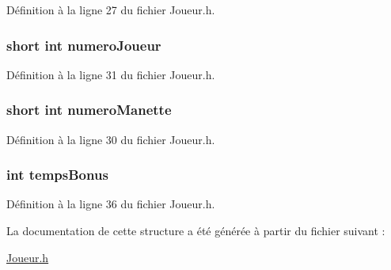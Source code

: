Définition à la ligne 27 du fichier Joueur.\-h.

\hypertarget{struct_joueur_a63ba7cc1f1d9cf8e7a5b77d508d833c4}{
\subsubsection[{numero\-Joueur}]{\setlength{\rightskip}{0pt plus 5cm}short int numero\-Joueur}}\label{struct_joueur_a63ba7cc1f1d9cf8e7a5b77d508d833c4}


Définition à la ligne 31 du fichier Joueur.\-h.

\hypertarget{struct_joueur_aeb402ac96372bb55a275a4166a0eb2bc}{
\subsubsection[{numero\-Manette}]{\setlength{\rightskip}{0pt plus 5cm}short int numero\-Manette}}\label{struct_joueur_aeb402ac96372bb55a275a4166a0eb2bc}


Définition à la ligne 30 du fichier Joueur.\-h.

\hypertarget{struct_joueur_a679330528c11db8bed0a19f30fe323e5}{
\subsubsection[{temps\-Bonus}]{\setlength{\rightskip}{0pt plus 5cm}int temps\-Bonus}}\label{struct_joueur_a679330528c11db8bed0a19f30fe323e5}


Définition à la ligne 36 du fichier Joueur.\-h.



La documentation de cette structure a été générée à partir du fichier suivant \-:\begin{DoxyCompactItemize}
\item 
\hyperlink{_joueur_8h}{Joueur.\-h}\end{DoxyCompactItemize}
